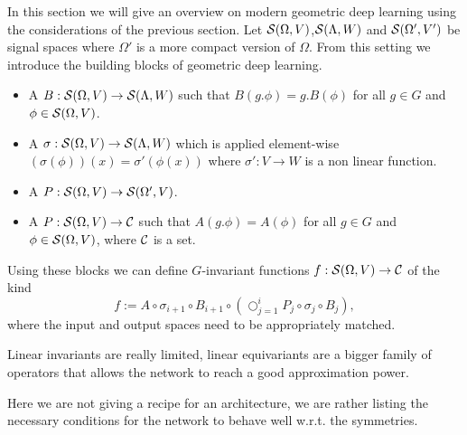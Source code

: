 \documentclass[../3.tex]{subfiles}
\begin{document}
    In this section we will give an overview on modern geometric deep learning using the considerations of the previous section.
    Let $\mathcal{S}(\Omega,V)$,$\mathcal{S}(\Lambda,W)$ and $\mathcal{S}(\Omega',V')$ be signal spaces where {\color{red} $\Omega'$ is a more compact version of $\Omega$}.
    From this setting we introduce the building blocks of geometric deep learning.

    \begin{itemize}
        \item A  $B : \mathcal{S}(\Omega,V) \to \mathcal{S}(\Lambda,W)$ such that
            $B(g.\phi) = g.B(\phi)$ for all $g \in G$ and $\phi \in \mathcal{S}(\Omega,V)$.
        \item A  $\sigma : \mathcal{S}(\Omega,V) \to \mathcal{S}(\Lambda,W)$ which is applied element-wise 
            $(\sigma(\phi))(x) = \sigma'(\phi(x))$ where $\sigma' : V \to W$ is a non linear function.
        \item A  $P : \mathcal{S}(\Omega,V) \to \mathcal{S}(\Omega',V)$.
        \item A  $P : \mathcal{S}(\Omega,V) \to \mathcal{C}$ such that $A(g.\phi) = A(\phi)$ for all $g \in G$ 
        and $\phi \in \mathcal{S}(\Omega,V)$, where $\mathcal{C}$ is a set.
    \end{itemize}

    Using these blocks we can define $G$-invariant functions $f : \mathcal{S}(\Omega,V) \to \mathcal{C}$ of the kind
    \[ f := A \circ \sigma_{i+1} \circ B_{i+1} \circ (\bigcirc_{j = 1}^i P_j \circ \sigma_j \circ B_j ) , \]
    where the input and output spaces need to be appropriately matched.


    Linear invariants are really limited, linear equivariants are a bigger family of operators that allows the network to reach a good approximation
    power.
    
    Here we are not giving a recipe for an architecture, we are rather listing the necessary conditions for the network to behave well w.r.t. the symmetries.
\end{document}
